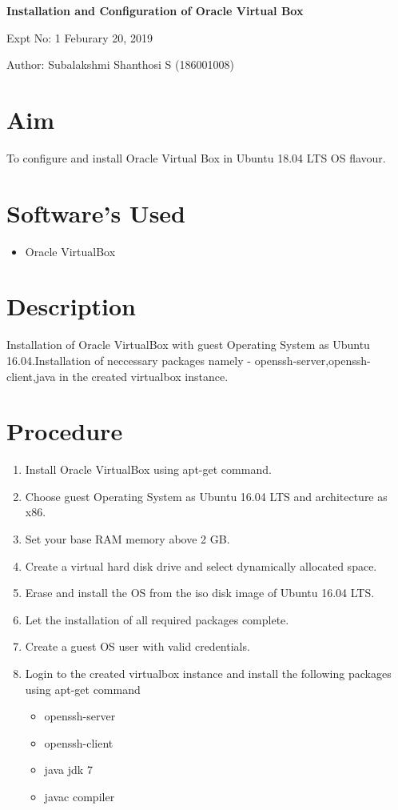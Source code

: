 \documentclass[a4paper,10pt]{article}
\begin{document}
\setcounter{secnumdepth}{-1} 

\begin{center}
\textbf{\LARGE Installation and Configuration of Oracle Virtual Box}
\end{center}

\raggedright Expt No: 1 \hfill \raggedleft Feburary 20, 2019 \\ 

\raggedright Author: Subalakshmi Shanthosi S  (186001008) \par 

\noindent\makebox[\linewidth]{\rule{\textwidth}{1pt}} 

\section{Aim}
To configure and install Oracle Virtual Box in Ubuntu 18.04 LTS OS flavour.

\section{Software's Used}
\begin{itemize}
  \item Oracle VirtualBox
\end{itemize}

\section{Description}
Installation of Oracle VirtualBox with guest Operating System as Ubuntu 16.04.Installation of neccessary packages namely - openssh-server,openssh-client,java in the created virtualbox instance.
\section{Procedure}

\begin{enumerate}
	\item Install Oracle VirtualBox using apt-get command.
	\item Choose guest Operating System as Ubuntu 16.04 LTS and architecture as x86.
	\item Set your base RAM memory above 2 GB.
	\item Create a virtual hard disk drive and select dynamically allocated space.
	\item Erase and install the OS from the iso disk image of Ubuntu 16.04 LTS.
	\item Let the installation of all required packages complete.
	\item Create a guest OS user with valid credentials.
	\item Login to the created virtualbox instance and install the following packages using apt-get command
	\begin{itemize}
		\item openssh-server
		\item openssh-client
		\item java jdk 7
		\item javac compiler
	\end{itemize}
\pagebreak
\end{enumerate}
\end{document}
